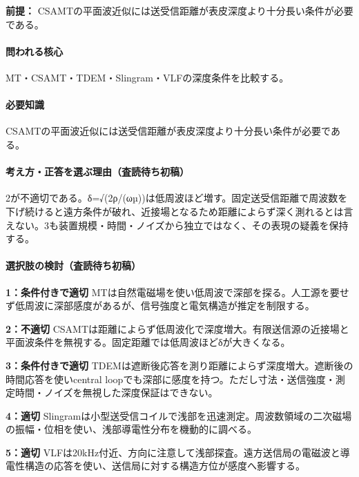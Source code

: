 \noindent\textbf{前提：} CSAMTの平面波近似には送受信距離が表皮深度より十分長い条件が必要である。\par

\paragraph{問われる核心} MT・CSAMT・TDEM・Slingram・VLFの深度条件を比較する。

\paragraph{必要知識} CSAMTの平面波近似には送受信距離が表皮深度より十分長い条件が必要である。

\paragraph{考え方・正答を選ぶ理由（査読待ち初稿）} 2が不適切である。δ=√(2ρ/(ωµ))は低周波ほど増す。固定送受信距離で周波数を下げ続けると遠方条件が破れ、近接場となるため距離によらず深く測れるとは言えない。3も装置規模・時間・ノイズから独立ではなく、その表現の疑義を保持する。

\paragraph{選択肢の検討（査読待ち初稿）}\mbox{}\par

\noindent\textbf{1：条件付きで適切} MTは自然電磁場を使い低周波で深部を探る。人工源を要せず低周波に深部感度があるが、信号強度と電気構造が推定を制限する。\par

\noindent\textbf{2：不適切} CSAMTは距離によらず低周波化で深度増大。有限送信源の近接場と平面波条件を無視する。固定距離では低周波ほどδが大きくなる。\par

\noindent\textbf{3：条件付きで適切} TDEMは遮断後応答を測り距離によらず深度増大。遮断後の時間応答を使いcentral loopでも深部に感度を持つ。ただし寸法・送信強度・測定時間・ノイズを無視した深度保証はできない。\par

\noindent\textbf{4：適切} Slingramは小型送受信コイルで浅部を迅速測定。周波数領域の二次磁場の振幅・位相を使い、浅部導電性分布を機動的に調べる。\par

\noindent\textbf{5：適切} VLFは20kHz付近、方向に注意して浅部探査。遠方送信局の電磁波と導電性構造の応答を使い、送信局に対する構造方位が感度へ影響する。\par


